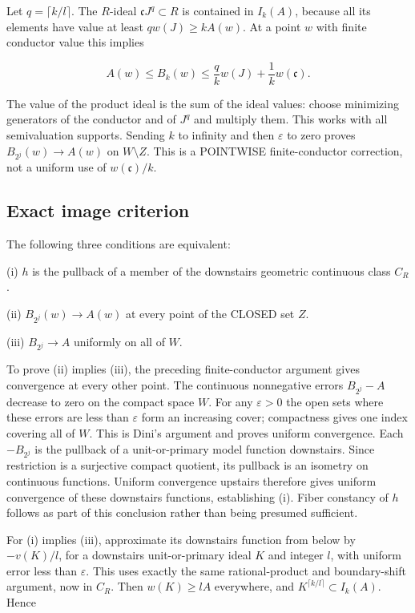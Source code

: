 \documentclass[11pt]{article}
\begin{document}
Let $q=\lceil k/l\rceil$. The $R$-ideal $\mathfrak cJ^q\subset R$ is contained in $I_k(A)$, because all its elements have value at least $q w(J)\ge kA(w)$. At a point $w$ with finite conductor value this implies

\[
A(w)\le B_k(w)\le\frac qk w(J)+\frac1k w(\mathfrak c).
\]

The value of the product ideal is the sum of the ideal values: choose minimizing generators of the conductor and of $J^q$ and multiply them. This works with all semivaluation supports. Sending $k$ to infinity and then $\varepsilon$ to zero proves $B_{2^j}(w)\longrightarrow A(w)$ on $W\setminus Z$. This is a POINTWISE finite-conductor correction, not a uniform use of $w(\mathfrak c)/k$.

\subsection{Exact image criterion}

The following three conditions are equivalent:

(i) $h$ is the pullback of a member of the downstairs geometric continuous class $C_R$.

(ii) $B_{2^j}(w)\longrightarrow A(w)$ at every point of the CLOSED set $Z$.

(iii) $B_{2^j}\longrightarrow A$ uniformly on all of $W$.

To prove (ii) implies (iii), the preceding finite-conductor argument gives convergence at every other point. The continuous nonnegative errors $B_{2^j}-A$ decrease to zero on the compact space $W$. For any $\varepsilon>0$ the open sets where these errors are less than $\varepsilon$ form an increasing cover; compactness gives one index covering all of $W$. This is Dini's argument and proves uniform convergence. Each $-B_{2^j}$ is the pullback of a unit-or-primary model function downstairs. Since restriction is a surjective compact quotient, its pullback is an isometry on continuous functions. Uniform convergence upstairs therefore gives uniform convergence of these downstairs functions, establishing (i). Fiber constancy of $h$ follows as part of this conclusion rather than being presumed sufficient.

For (i) implies (iii), approximate its downstairs function from below by $-v(K)/l$, for a downstairs unit-or-primary ideal $K$ and integer $l$, with uniform error less than $\varepsilon$. This uses exactly the same rational-product and boundary-shift argument, now in $C_R$. Then $w(K)\ge lA$ everywhere, and $K^{\lceil k/l\rceil}\subset I_k(A)$. Hence
\end{document}
